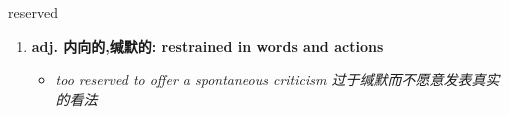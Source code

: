 
\begin{frame}
{\huge reserved}
\begin{center}
\begin{enumerate}\Large
  \item \textbf{adj. 内向的,缄默的: restrained in words and actions}
  \begin{itemize}
    \item \em{\Large{too reserved to offer a spontaneous criticism 过于缄默而不愿意发表真实的看法}}
  \end{itemize}
\end{enumerate}
\end{center}
\end{frame}
